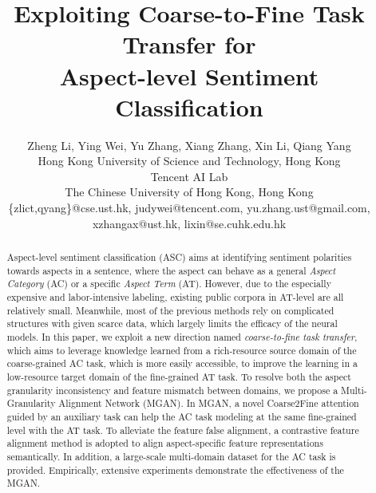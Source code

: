 \documentclass[letterpaper]{article} \usepackage{aaai19}  \usepackage{times}  \usepackage{latexsym}
\begin{document}
\title{Exploiting Coarse-to-Fine Task Transfer for \\ Aspect-level Sentiment Classification}


\author{Zheng Li, Ying Wei, Yu Zhang, Xiang Zhang, Xin Li, Qiang Yang\\
Hong Kong University of Science and Technology, Hong Kong\\
Tencent AI Lab\\
The Chinese University of Hong Kong, Hong Kong\\
\{zlict,qyang\}@cse.ust.hk, judywei@tencent.com, yu.zhang.ust@gmail.com, xzhangax@ust.hk, lixin@se.cuhk.edu.hk}
\maketitle

\begin{abstract}
Aspect-level sentiment classification (ASC) aims at identifying sentiment polarities towards aspects in a sentence, where the aspect can behave as a general {\it Aspect Category} (AC) or a specific {\it Aspect Term} (AT). However, due to the especially expensive and labor-intensive labeling, existing public corpora in AT-level are all relatively small. Meanwhile, most of the previous methods rely on complicated structures with given scarce data, which largely limits the efficacy of the neural models. In this paper, we exploit a new direction named {\it coarse-to-fine task transfer}, which aims to leverage knowledge learned from a rich-resource source domain of the coarse-grained AC task, which is more easily accessible, to improve the learning in a low-resource target domain of the fine-grained AT task. To resolve both the aspect granularity inconsistency and feature mismatch between domains, we propose a Multi-Granularity Alignment Network (MGAN). In MGAN, a novel Coarse2Fine attention guided by an auxiliary task can help the AC task modeling at the same fine-grained level with the AT task. To alleviate the feature false alignment, a contrastive feature alignment method is adopted to align aspect-specific feature representations semantically. In addition, a large-scale multi-domain dataset for the AC task is provided. Empirically, extensive experiments demonstrate the effectiveness of the MGAN. 
\vspace{-2.5mm}
\end{abstract}
\end{document}
